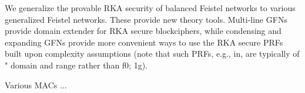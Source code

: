 

We generalize the provable RKA security of balanced Feistel networks to various
generalized Feistel networks.
These provide new theory tools.
Multi-line GFNs provide domain extender for RKA secure blockciphers, while
condensing and expanding GFNs provide more convenient ways to use the RKA
secure PRFs built upon complexity assumptions (note that such PRFs, e.g., in,
are typically of \abnormal" domain and range rather than f0; 1g).




\medskip{}
Various MACs ...




